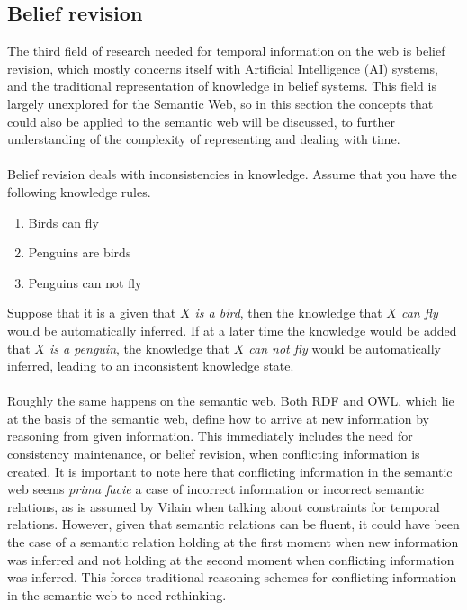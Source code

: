 \documentclass{llncs}
\begin{document}

\subsection{Belief revision}
The third field of research needed for temporal information on the web is belief revision, which mostly concerns itself with Artificial Intelligence (AI) systems, and the traditional representation of knowledge in belief systems. This field is largely unexplored for the Semantic Web, so in this section the concepts that could also be applied to the semantic web will be discussed, to further understanding of the complexity of representing and dealing with time.\\
\\
Belief revision deals with inconsistencies in knowledge. Assume that you have the following knowledge rules.

\begin{enumerate}
\item Birds can fly
\item Penguins are birds
\item Penguins can not fly
\end{enumerate}

Suppose that it is a given that \emph{$X$ is a bird}, then the knowledge that \emph{$X$ can fly} would be automatically inferred. If at a later time the knowledge would be added that \emph{$X$ is a penguin}, the knowledge that \emph{$X$ can not fly} would be automatically inferred, leading to an inconsistent knowledge state.\\
\\
Roughly the same happens on the semantic web. Both RDF and OWL, which lie at the basis of the semantic web, define how to arrive at new information by reasoning from given information.\cite{Volz2005} This immediately includes the need for consistency maintenance, or belief revision, when conflicting information is created. It is important to note here that conflicting information in the semantic web seems \emph{prima facie} a case of incorrect information or incorrect semantic relations, as is assumed by Vilain when talking about constraints for temporal relations.\cite{Vilain1986} However, given that semantic relations can be fluent, it could have been the case of a semantic relation holding at the first moment when new information was inferred and not holding at the second moment when conflicting information was inferred. This forces traditional reasoning schemes for conflicting information in the semantic web to need rethinking.
\end{document}
